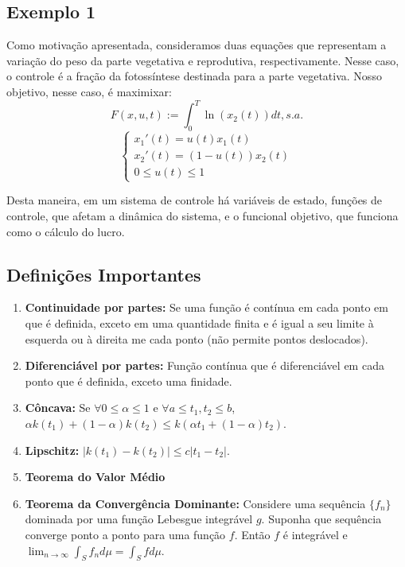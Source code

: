 \subsection*{Exemplo 1}

Como motivação apresentada, consideramos duas equações que representam a variação do peso da parte vegetativa e reprodutiva, respectivamente. Nesse caso, o controle é a fração da fotossíntese destinada para a parte vegetativa. Nosso objetivo, nesse caso, é maximixar: 
\begin{equation*}
F(x,u,t) := \int_0^T \ln(x_2(t))dt, s.a. 
\end{equation*} 
\begin{equation*}
\begin{cases}
x_1'(t) = u(t)x_1(t) \\
x_2'(t) = (1 - u(t))x_2(t) \\
0 \leq u(t) \leq 1
\end{cases}    
\end{equation*}

Desta maneira, em um sistema de controle há variáveis de estado, funções de controle, que afetam a dinâmica do sistema, e o funcional objetivo, que funciona como o cálculo do lucro. 

\subsection{Definições Importantes}
\begin{enumerate}
    \item \textbf{Continuidade por partes:} Se uma função é contínua em cada ponto em que é definida, exceto em uma quantidade finita e é igual a seu limite à esquerda ou à direita me cada ponto (não permite pontos deslocados). 
    \item \textbf{Diferenciável por partes:} Função contínua que é diferenciável em cada ponto que é definida, exceto uma finidade.
    \item \textbf{Côncava: } Se $\forall 0 \leq \alpha \leq 1$ e $\forall a \leq t_1,t_2 \leq b$, $\alpha k(t_1) + (1 - \alpha)k(t_2) \leq k(\alpha t_1 + (1 - \alpha)t_2)$.
    \item \textbf{Lipschitz: } $|k(t_1) - k(t_2)| \leq c|t_1 - t_2|$.
    \item \textbf{Teorema do Valor Médio}
    \item \textbf{Teorema da Convergência Dominante: } Considere uma sequência $\{f_n\}$ dominada por uma função Lebesgue integrável $g$. Suponha que sequência converge ponto a ponto para uma função $f$. Então $f$ é integrável e $\lim_{n \to \infty} \int_S f_n d\mu = \int_S f d\mu$.
\end{enumerate}

